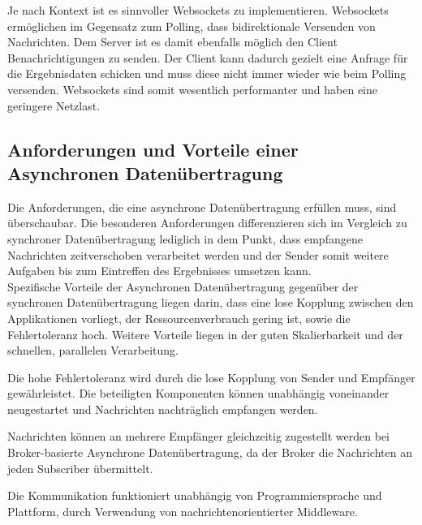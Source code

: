 Je nach Kontext ist es sinnvoller Websockets zu implementieren. Websockets ermöglichen im Gegensatz zum Polling, dass bidirektionale Versenden von Nachrichten. Dem Server ist es damit ebenfalls möglich den Client Benachrichtigungen zu senden. Der Client kann dadurch gezielt eine Anfrage für die Ergebnisdaten schicken und muss diese nicht immer wieder wie beim Polling versenden. Websockets sind somit wesentlich performanter und haben eine geringere Netzlast. \cite*{goll:2020}

\subsection{Anforderungen und Vorteile einer Asynchronen Datenübertragung}
Die Anforderungen, die eine asynchrone Datenübertragung erfüllen muss, sind überschaubar. Die besonderen Anforderungen differenzieren sich im Vergleich zu synchroner Datenübertragung lediglich in dem Punkt, dass empfangene Nachrichten zeitverschoben verarbeitet werden \cite*{tremp:2021} und der Sender somit weitere Aufgaben bis zum Eintreffen des Ergebnisses umsetzen kann.  \\

Spezifische Vorteile der Asynchronen Datenübertragung gegenüber der synchronen Datenübertragung liegen darin, dass eine lose Kopplung zwischen den Applikationen vorliegt, der Ressourcenverbrauch gering ist, sowie die Fehlertoleranz hoch. \cite*{tremp:2021}
Weitere Vorteile liegen in der guten Skalierbarkeit und der schnellen, parallelen Verarbeitung. \cite*{tremp:2021}

Die hohe Fehlertoleranz wird durch die lose Kopplung von Sender und Empfänger gewährleistet. Die beteiligten Komponenten können unabhängig voneinander neugestartet und Nachrichten nachträglich empfangen werden. \cite*{abts:2019}

Nachrichten können an mehrere Empfänger gleichzeitig zugestellt werden bei Broker-basierte Asynchrone Datenübertragung, da der Broker die Nachrichten an jeden Subscriber übermittelt. \cite*{abts:2019}

Die Kommunikation funktioniert unabhängig von Programmiersprache und Plattform, durch Verwendung von nachrichtenorientierter Middleware. \cite{abts:2019}